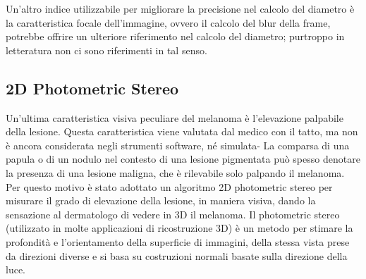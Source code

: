 Un'altro indice utilizzabile per migliorare la precisione nel calcolo del diametro è la caratteristica focale dell'immagine, ovvero il calcolo del blur della frame, potrebbe offrire un ulteriore riferimento nel calcolo del diametro; purtroppo in letteratura non ci sono riferimenti in tal senso.
\newpage
\subsection{2D Photometric Stereo}
Un'ultima caratteristica visiva peculiare del melanoma è l'elevazione palpabile della lesione. 
\newline
Questa caratteristica viene valutata dal medico con il tatto, ma non è ancora considerata negli strumenti software, né simulata- 
\newline
La comparsa di una papula o di un nodulo nel contesto di una lesione pigmentata può spesso denotare la presenza di una lesione maligna, che è rilevabile solo palpando il melanoma.
\newline
Per questo motivo è stato adottato un algoritmo 2D photometric stereo per misurare il grado di elevazione della lesione, in maniera visiva, dando la sensazione al dermatologo di vedere in 3D il melanoma.
\newline
Il photometric stereo (utilizzato in molte applicazioni di ricostruzione 3D) è un metodo per stimare la profondità e l'orientamento della superficie di immagini, della stessa vista prese da direzioni diverse \cite{xie2016deep3d} e si basa su costruzioni normali basate sulla direzione della luce.

